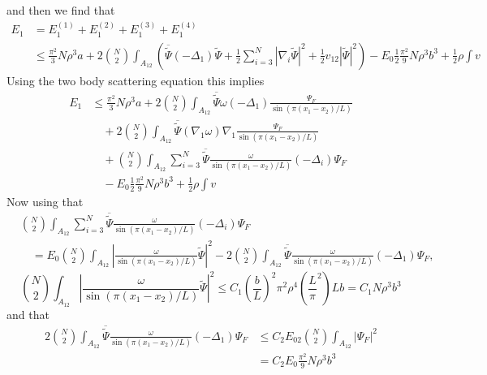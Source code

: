 \documentclass[a4paper,11pt]{article}
\newcommand{\abs}[1]{\left\lvert #1 \right\rvert}
\numberwithin{equation}{section}
\begin{document}
	 and then we find that \begin{equation}
	\begin{aligned}
	E_1&=E_1^{(1)}+E_1^{(2)}+E_1^{(3)}+E_1^{(4)}\\&\leq \frac{\pi^2}{3}N\rho^3 a+2\binom{N}{2}\int_{A_{12}}\left(\overline{\tilde{\Psi}}(-\Delta_1)\tilde{\Psi}+\frac{1}{2}\sum_{i=3}^{N}\abs{\nabla_i\tilde{\Psi}}^2+\frac{1}{2}v_{12}\abs{\tilde{\Psi}}^2\right)-E_0\frac{1}{2}\frac{\pi^2}{9}N\rho^3b^3+\frac{1}{2}\rho \int v
	\end{aligned}
	\end{equation}
	Using the two body scattering equation this implies \begin{equation}
	\begin{aligned}
	E_1&\leq \frac{\pi^2}{3}N\rho^3 a+2\binom{N}{2}\int_{A_{12}}\overline{\tilde{\Psi}}\omega(-\Delta_1)\frac{\Psi_F}{\sin(\pi(x_1-x_2)/L)}\\&\quad+2\binom{N}{2}\int_{A_{12}}\overline{\tilde{\Psi}}(\nabla_1\omega)\nabla_1\frac{\Psi_F}{\sin(\pi(x_1-x_2)/L)}\\
	&\quad +\binom{N}{2}\int_{A_{12}}\sum_{i=3}^{N} \overline{\tilde{\Psi}}\frac{\omega}{\sin(\pi(x_1-x_2)/L)}(-\Delta_i)\Psi_F
	\\&\quad-E_0\frac{1}{2}\frac{\pi^2}{9}N\rho^3b^3+\frac{1}{2}\rho \int v
	\end{aligned}
	\end{equation}
	Now using that \begin{equation}
	\begin{aligned}
	&\binom{N}{2}\int_{A_{12}}\sum_{i=3}^{N} \overline{\tilde{\Psi}}\frac{\omega}{\sin(\pi(x_1-x_2)/L)}(-\Delta_i)\Psi_F\\&\quad=E_0\binom{N}{2}\int_{A_{12}}\left\lvert\frac{\omega}{\sin(\pi(x_1-x_2)/L)}\tilde{\Psi}\right\rvert^2-2\binom{N}{2}\int_{A_{12}} \overline{\tilde{\Psi}}\frac{\omega}{\sin(\pi(x_1-x_2)/L)}(-\Delta_1)\Psi_F,
	\end{aligned}
	\end{equation}
	 \begin{equation}
	\binom{N}{2}\int_{A_{12}}\left\lvert\frac{\omega}{\sin(\pi(x_1-x_2)/L)}\tilde{\Psi}\right\rvert^2\leq C_1 \left(\frac{b}{L}\right)^2\pi^2\rho^4 \left(\frac{L}{\pi}^2\right) L b=C_1N\rho^3 b^3
	\end{equation}
	and that \begin{equation}
	\begin{aligned}
	2\binom{N}{2}\int_{A_{12}} \overline{\tilde{\Psi}}\frac{\omega}{\sin(\pi(x_1-x_2)/L)}(-\Delta_1)\Psi_F&\leq C_2E_02\binom{N}{2}\int_{A_{12}}\abs{\Psi_F}^2\\
	&=C_2 E_0 \frac{\pi^2}{9}N\rho^3b^3
	\end{aligned}
	\end{equation}
\end{document}
